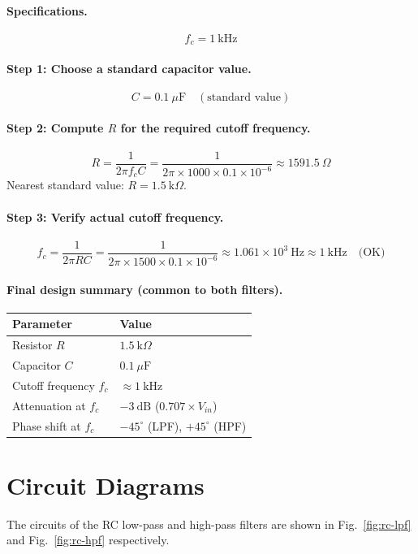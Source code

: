 \paragraph{Specifications.}
\[
f_c = 1\ \text{kHz}
\]

\paragraph{Step 1: Choose a standard capacitor value.}
\[
C = 0.1\ \mu\text{F} \quad (\text{standard value})
\]

\paragraph{Step 2: Compute $R$ for the required cutoff frequency.}
\[
R = \frac{1}{2\pi f_c C} = \frac{1}{2\pi \times 1000 \times 0.1\times10^{-6}}
\approx 1591.5\ \Omega
\]
Nearest standard value: $\boxed{R = 1.5\ \text{k}\Omega}$.

\paragraph{Step 3: Verify actual cutoff frequency.}
\[
f_c = \frac{1}{2\pi R C} = \frac{1}{2\pi \times 1500 \times 0.1\times10^{-6}}
\approx 1.061\times 10^{3}\ \text{Hz} \approx 1\ \text{kHz} \quad \text{(OK)}
\]

\paragraph{Final design summary (common to both filters).}
\begin{center}
	\begin{tabular}{@{}ll@{}}
		\toprule
		Parameter & Value \\
		\midrule
		Resistor $R$ & $1.5\ \text{k}\Omega$ \\
		Capacitor $C$ & $0.1\ \mu\text{F}$ \\
		Cutoff frequency $f_c$ & $\approx 1\ \text{kHz}$ \\
		Attenuation at $f_c$ & $-3\ \text{dB}$ ($0.707\times V_{in}$) \\
		Phase shift at $f_c$ & $-45^\circ$ (LPF), $+45^\circ$ (HPF) \\
		\bottomrule
	\end{tabular}
\end{center}

\section{Circuit Diagrams}
The circuits of the RC low-pass and high-pass filters are shown in Fig.~\ref{fig:rc-lpf} and Fig.~\ref{fig:rc-hpf} respectively. 

